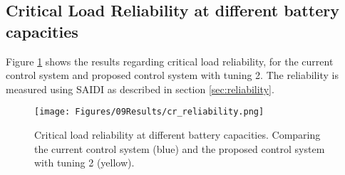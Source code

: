 \subsection{Critical Load Reliability at different battery capacities}
Figure \ref{fig:cr_reliability} shows the results regarding critical load reliability, for the current control system and proposed control system with tuning 2. The reliability is measured using SAIDI as described in section \ref{sec:reliability}. 

\begin{figure}[h]
    \centering
    \texttt{[image: Figures/09Results/cr\_reliability.png]}
    \caption[Critical Load Reliability]{Critical load reliability at different battery capacities. Comparing the current control system (blue) and the proposed control system with tuning 2 (yellow). }
    \label{fig:cr_reliability}
\end{figure}